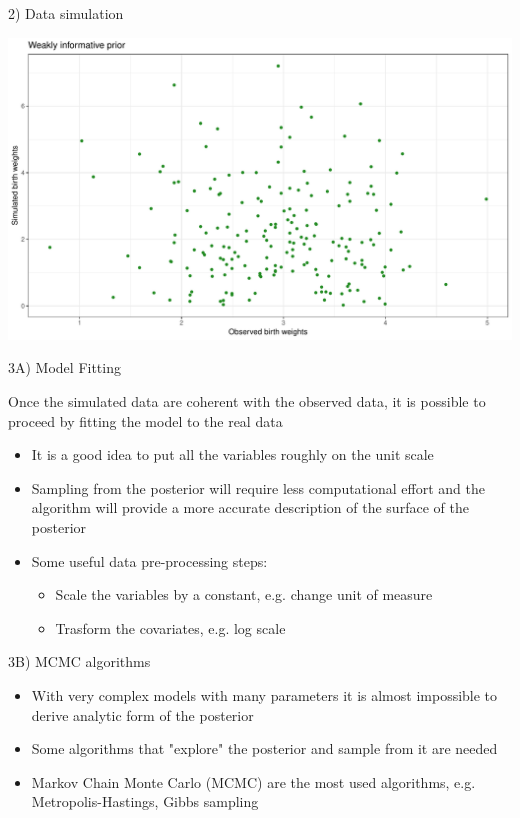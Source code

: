 \documentclass[ignorenonframetext,a4paper]{beamer}
\begin{document}
\begin{frame}{2) Data simulation}

\includegraphics{DB_presentation_slides_files/figure-beamer/unnamed-chunk-6-1.pdf}

\end{frame}

\begin{frame}{3A) Model Fitting}

Once the simulated data are coherent with the observed data, it is
possible to proceed by fitting the model to the real data

\begin{itemize}
\setlength\itemsep{1em}
  \item{It is a good idea to put all the variables roughly on the
        unit scale}
  \item{Sampling from the posterior will require less computational
        effort and the algorithm will provide a more accurate 
        description of the surface of the posterior}
  \item{Some useful data pre-processing steps:}
  \begin{itemize}
    \item{Scale the variables by a constant, e.g. change unit of measure}
    \item{Trasform the covariates, e.g. log scale}
  \end{itemize}
\end{itemize}

\end{frame}

\begin{frame}{3B) MCMC algorithms}

\begin{itemize}
\setlength\itemsep{1em}
  \item{With very complex models with many parameters it is almost
        impossible to derive analytic form of the posterior}
  \item{Some algorithms that "explore" the posterior and sample from
        it are needed}
  \item{Markov Chain Monte Carlo (MCMC) are the most used algorithms,
        e.g. Metropolis-Hastings, Gibbs sampling}
\end{itemize}

\end{frame}
\end{document}
